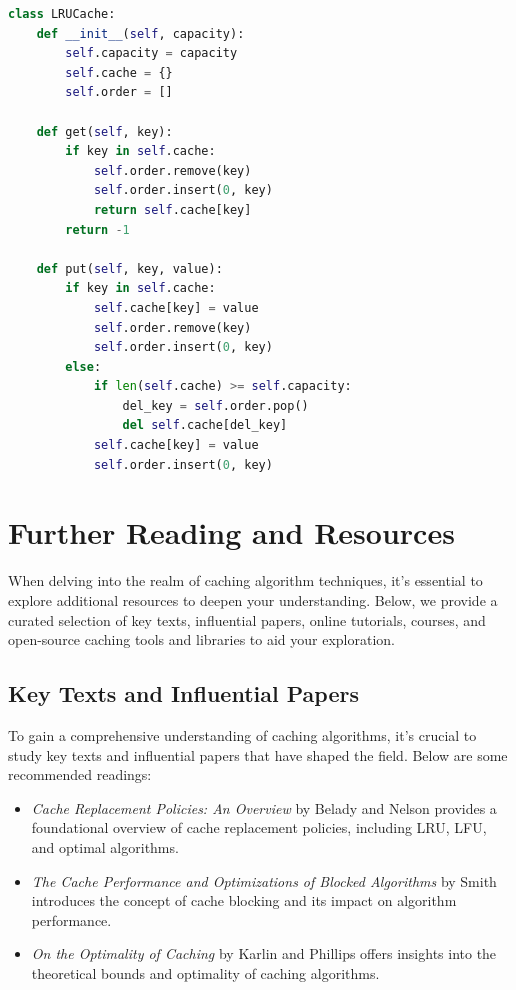 \documentclass[12pt]{book} %
\begin{document}
\begin{lstlisting}[language=Python, caption=Python Implementation of LRU Cache]
class LRUCache:
    def __init__(self, capacity):
        self.capacity = capacity
        self.cache = {}
        self.order = []

    def get(self, key):
        if key in self.cache:
            self.order.remove(key)
            self.order.insert(0, key)
            return self.cache[key]
        return -1

    def put(self, key, value):
        if key in self.cache:
            self.cache[key] = value
            self.order.remove(key)
            self.order.insert(0, key)
        else:
            if len(self.cache) >= self.capacity:
                del_key = self.order.pop()
                del self.cache[del_key]
            self.cache[key] = value
            self.order.insert(0, key)
\end{lstlisting}


\section{Further Reading and Resources}
When delving into the realm of caching algorithm techniques, it's essential to explore additional resources to deepen your understanding. Below, we provide a curated selection of key texts, influential papers, online tutorials, courses, and open-source caching tools and libraries to aid your exploration.

\subsection{Key Texts and Influential Papers}
To gain a comprehensive understanding of caching algorithms, it's crucial to study key texts and influential papers that have shaped the field. Below are some recommended readings:
\begin{itemize}
    \item \textit{Cache Replacement Policies: An Overview} by Belady and Nelson provides a foundational overview of cache replacement policies, including LRU, LFU, and optimal algorithms.
    \item \textit{The Cache Performance and Optimizations of Blocked Algorithms} by Smith introduces the concept of cache blocking and its impact on algorithm performance.
    \item \textit{On the Optimality of Caching} by Karlin and Phillips offers insights into the theoretical bounds and optimality of caching algorithms.
\end{itemize}
\end{document}
